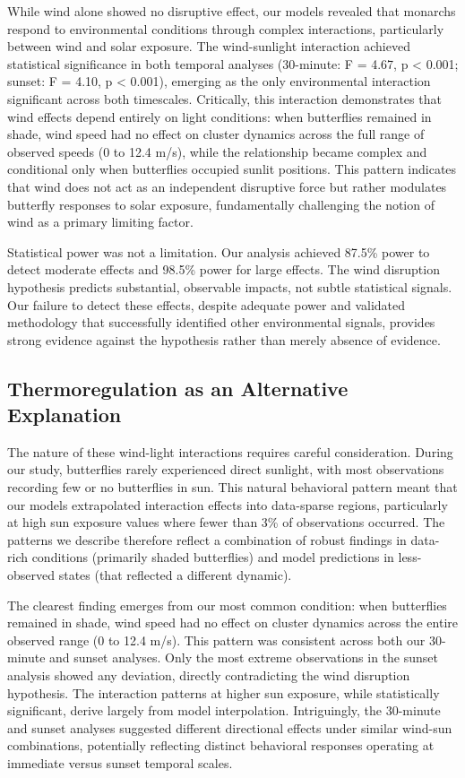While wind alone showed no disruptive effect, our models revealed that monarchs respond to environmental conditions through complex interactions, particularly between wind and solar exposure. The wind-sunlight interaction achieved statistical significance in both temporal analyses (30-minute: F = 4.67, p < 0.001; sunset: F = 4.10, p < 0.001), emerging as the only environmental interaction significant across both timescales. Critically, this interaction demonstrates that wind effects depend entirely on light conditions: when butterflies remained in shade, wind speed had no effect on cluster dynamics across the full range of observed speeds (0 to 12.4 m/s), while the relationship became complex and conditional only when butterflies occupied sunlit positions. This pattern indicates that wind does not act as an independent disruptive force but rather modulates butterfly responses to solar exposure, fundamentally challenging the notion of wind as a primary limiting factor.

Statistical power was not a limitation. Our analysis achieved 87.5\% power to detect moderate effects and 98.5\% power for large effects. The wind disruption hypothesis predicts substantial, observable impacts, not subtle statistical signals. Our failure to detect these effects, despite adequate power and validated methodology that successfully identified other environmental signals, provides strong evidence against the hypothesis rather than merely absence of evidence.

\subsection{Thermoregulation as an Alternative Explanation}

The nature of these wind-light interactions requires careful consideration. During our study, butterflies rarely experienced direct sunlight, with most observations recording few or no butterflies in sun. This natural behavioral pattern meant that our models extrapolated interaction effects into data-sparse regions, particularly at high sun exposure values where fewer than 3\% of observations occurred. The patterns we describe therefore reflect a combination of robust findings in data-rich conditions (primarily shaded butterflies) and model predictions in less-observed states (that reflected a different dynamic).

The clearest finding emerges from our most common condition: when butterflies remained in shade, wind speed had no effect on cluster dynamics across the entire observed range (0 to 12.4 m/s). This pattern was consistent across both our 30-minute and sunset analyses. Only the most extreme observations in the sunset analysis showed any deviation, directly contradicting the wind disruption hypothesis. The interaction patterns at higher sun exposure, while statistically significant, derive largely from model interpolation. Intriguingly, the 30-minute and sunset analyses suggested different directional effects under similar wind-sun combinations, potentially reflecting distinct behavioral responses operating at immediate versus sunset temporal scales.

